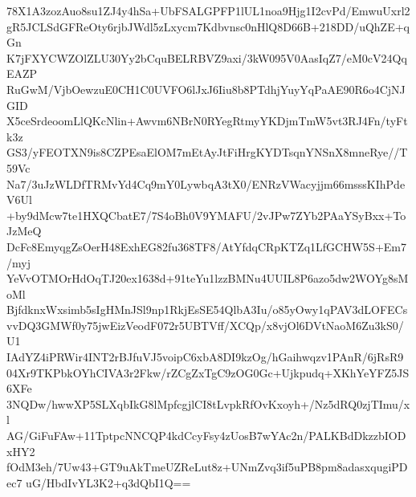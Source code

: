 78X1A3zozAuo8su1ZJ4y4hSa+UbFSALGPFP1lUL1noa9Hjg1I2cvPd/EmwuUxrl2
gR5JCLSdGFReOty6rjbJWdl5zLxycm7Kdbvnsc0nHlQ8D66B+218DD/uQhZE+qGn
K7jFXYCWZOlZLU30Yy2bCquBELRBVZ9axi/3kW095V0AasIqZ7/eM0cV24QqEAZP
RuGwM/VjbOewzuE0CH1C0UVFO6lJxJ6Iiu8b8PTdhjYuyYqPaAE90R6o4CjNJGID
X5ceSrdeoomLlQKcNlin+Awvm6NBrN0RYegRtmyYKDjmTmW5vt3RJ4Fn/tyFtk3z
GS3/yFEOTXN9is8CZPEsaElOM7mEtAyJtFiHrgKYDTsqnYNSnX8mneRye//T59Vc
Na7/3uJzWLDfTRMvYd4Cq9mY0LywbqA3tX0/ENRzVWacyjjm66msssKIhPdeV6Ul
+by9dMcw7te1HXQCbatE7/7S4oBh0V9YMAFU/2vJPw7ZYb2PAaYSyBxx+ToJzMeQ
DcFc8EmyqgZsOerH48ExhEG82fu368TF8/AtYfdqCRpKTZq1LfGCHW5S+Em7/myj
YeVvOTMOrHdOqTJ20ex1638d+91teYu1lzzBMNu4UUIL8P6azo5dw2WOYg8sMoMl
BjfdknxWxsimb5sIgHMnJSl9np1RkjEsSE54QlbA3Iu/o85yOwy1qPAV3dLOFECs
vvDQ3GMWf0y75jwEizVeodF072r5UBTVff/XCQp/x8vjOl6DVtNaoM6Zu3kS0/U1
IAdYZ4iPRWir4INT2rBJfuVJ5voipC6xbA8DI9kzOg/hGaihwqzv1PAnR/6jRsR9
04Xr9TKPbkOYhCIVA3r2Fkw/rZCgZxTgC9zOG0Gc+Ujkpudq+XKhYeYFZ5JS6XFe
3NQDw/hwwXP5SLXqbIkG8lMpfcgjlCI8tLvpkRfOvKxoyh+/Nz5dRQ0zjTImu/xl
AG/GiFuFAw+11TptpcNNCQP4kdCcyFsy4zUosB7wYAc2n/PALKBdDkzzbIODxHY2
fOdM3eh/7Uw43+GT9uAkTmeUZReLut8z+UNmZvq3if5uPB8pm8adasxqugiPDec7
uG/HbdIvYL3K2+q3dQbI1Q==
